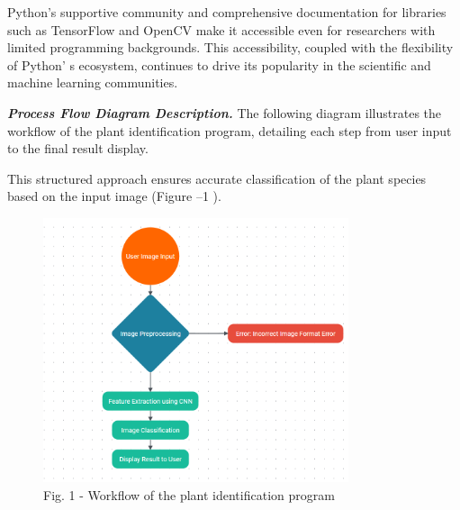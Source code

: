 \begin{multicols}{2}
Python's supportive community and comprehensive documentation for
libraries such as TensorFlow and OpenCV make it accessible even for
researchers with limited programming backgrounds. This accessibility,
coupled with the flexibility of Python' s ecosystem,
continues to drive its popularity in the scientific and machine learning
communities.

\emph{{\bfseries Process Flow Diagram Description.}} The following diagram
illustrates the workflow of the plant identification program, detailing
each step from user input to the final result display.

This structured approach ensures accurate classification of the plant
species based on the input image (Figure --1 ).
\end{multicols}

\begin{figure}[H]
	\centering
	\includegraphics[width=0.8\textwidth]{media/ict/image31}
	\caption*{Fig. 1 - Workflow of the plant identification program}
\end{figure}

